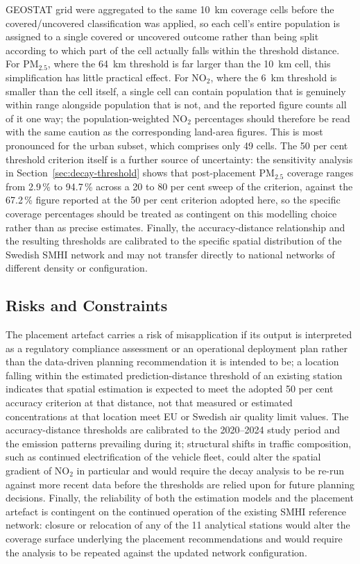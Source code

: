 \documentclass[11pt,a4paper]{article}
\let\oldsubsection\subsection
\renewcommand{\subsection}{\FloatBarrier\oldsubsection}
\begin{document}
GEOSTAT grid were aggregated to the same 10~km coverage cells before the covered/uncovered classification was applied, so each cell's entire population is assigned to a single covered or uncovered outcome rather than being split according to which part of the cell actually falls within the threshold distance. For PM$_{2.5}$, where the 64~km threshold is far larger than the 10~km cell, this simplification has little practical effect. For NO$_2$, where the 6~km threshold is smaller than the cell itself, a single cell can contain population that is genuinely within range alongside population that is not, and the reported figure counts all of it one way; the population-weighted NO$_2$ percentages should therefore be read with the same caution as the corresponding land-area figures. This is most pronounced for the urban subset, which comprises only 49 cells. The 50 per cent threshold criterion itself is a further source of uncertainty: the sensitivity analysis in Section~\ref{sec:decay-threshold} shows that post-placement PM$_{2.5}$ coverage ranges from 2.9\,\% to 94.7\,\% across a 20 to 80 per cent sweep of the criterion, against the 67.2\,\% figure reported at the 50 per cent criterion adopted here, so the specific coverage percentages should be treated as contingent on this modelling choice rather than as precise estimates. Finally, the accuracy-distance relationship and the resulting thresholds are calibrated to the specific spatial distribution of the Swedish SMHI network and may not transfer directly to national networks of different density or configuration.

\subsection{Risks and Constraints}
\label{sec:discussion-risks}

The placement artefact carries a risk of misapplication if its output is interpreted as a regulatory compliance assessment or an operational deployment plan rather than the data-driven planning recommendation it is intended to be; a location falling within the estimated prediction-distance threshold of an existing station indicates that spatial estimation is expected to meet the adopted 50 per cent accuracy criterion at that distance, not that measured or estimated concentrations at that location meet EU or Swedish air quality limit values. The accuracy-distance thresholds are calibrated to the 2020--2024 study period and the emission patterns prevailing during it; structural shifts in traffic composition, such as continued electrification of the vehicle fleet, could alter the spatial gradient of NO$_2$ in particular and would require the decay analysis to be re-run against more recent data before the thresholds are relied upon for future planning decisions. Finally, the reliability of both the estimation models and the placement artefact is contingent on the continued operation of the existing SMHI reference network: closure or relocation of any of the 11 analytical stations would alter the coverage surface underlying the placement recommendations and would require the analysis to be repeated against the updated network configuration.
\end{document}
